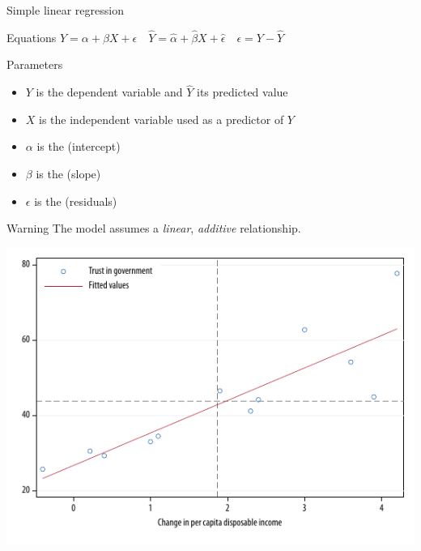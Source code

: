 \documentclass[t]{beamer}
\begin{document}
	
	\begin{frame}{Simple linear regression}
		 
		\begin{block}{Equations}
			$Y = \alpha + \beta X + \epsilon \quad \hat{Y} = \hat{\alpha} + \hat{\beta} X + \hat{\epsilon} \quad \epsilon = Y - \hat{Y}$
		\end{block}
		
		\begin{block}{Parameters}
			\begin{itemize}
			 	\item $Y$ is the dependent variable and $\hat{Y}$ its predicted value
			 	\item $X$ is the independent variable used as a predictor of $Y$
			 	\item $\alpha$ is the  (intercept)
			 	\item $\beta$ is the  (slope)
			 	\item $\epsilon$ is the  (residuals)
			\end{itemize}
		\end{block}

		\begin{alertblock}{Warning}
		 	The model assumes a \emph{linear}, \emph{additive} relationship.
		\end{alertblock}
		
	\end{frame}



	\begin{frame}[c] %
			
		\begin{center}
			\includegraphics[width=\textwidth]{trust-linear-fit-1}
		\end{center}
				
	\end{frame}
\end{document}
